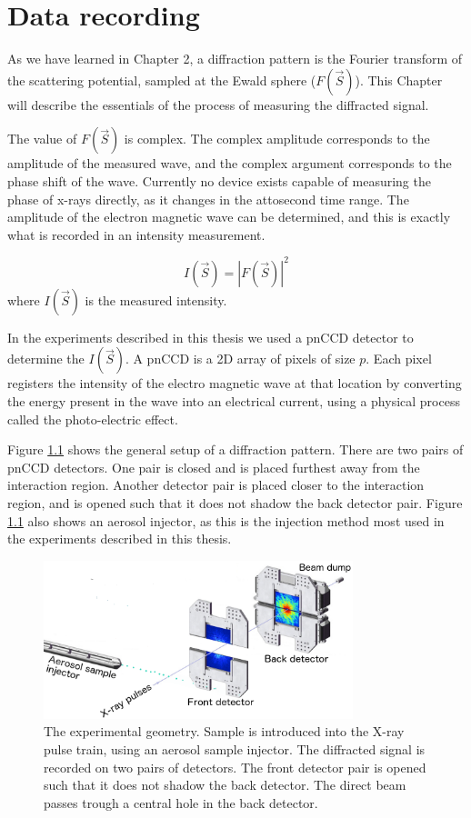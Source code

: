 \chapter{Data recording}
As we have learned in Chapter 2, a diffraction pattern is the Fourier transform of the scattering potential, sampled at the Ewald sphere ($F({\vec{S}})$). This Chapter will describe the essentials of the process of measuring the diffracted signal.

The value of $F(\vec{S})$ is complex. The complex amplitude corresponds to the amplitude of the measured wave, and the complex argument corresponds to the phase shift of the wave. Currently no device exists capable of measuring the phase of x-rays directly, as it changes in the attosecond time range. The amplitude of the electron magnetic wave can be determined, and this is exactly what is recorded in an intensity measurement. 

\begin{equation}
I(\vec{S}) = |F(\vec{S})|^2
\end{equation}
where $I(\vec{S})$ is the measured intensity.

In the experiments described in this thesis we used a pnCCD detector to determine the $I(\vec{S})$. A pnCCD is a 2D array of pixels of size $p$. Each pixel registers the intensity of the electro magnetic wave at that location by converting the energy present in the wave into an electrical current, using a physical process called the photo-electric effect. 

Figure \ref{fig:experimental_geometry} shows the general setup of a diffraction pattern. There are two pairs of pnCCD detectors. One pair is closed and is placed furthest away from the interaction region. Another detector pair is placed closer to the interaction region, and is opened such that it does not shadow the back detector pair. Figure \ref{fig:experimental_geometry} also shows an aerosol injector, as this is the injection method most used in the experiments described in this thesis.

\begin{figure}[h]
\centering
\includegraphics[width=90mm]{Geometry2.png}
\caption{The experimental geometry. Sample is introduced into the X-ray pulse train, using an aerosol sample injector. The diffracted signal is recorded on two pairs of detectors. The front detector pair is opened such that it does not shadow the back detector. The direct beam passes trough a central hole in the back detector.}\label{fig:experimental_geometry}
\end{figure}


